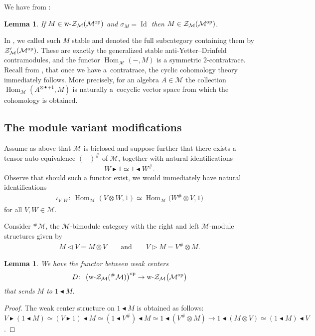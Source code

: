 \documentclass[pdftex]{sigma}
\newcommand{\Zc}{\mathcal{Z}}
\newcommand{\la}{\triangleright}
\newcommand{\ra}{\triangleleft}
\newcommand{\lab}{\blacktriangleright}
\newcommand{\rab}{\blacktriangleleft}
\def\ot{\otimes}
\numberwithin{equation}{section}
\newtheorem{Lemma}[Theorem]{Lemma}
 { \theoremstyle{definition}
\newtheorem{Definition}[Theorem]{Definition}
\newtheorem{Remark}[Theorem]{Remark} }
\begin{document}
We have from \cite{sk}:
\begin{Lemma}\label{weakstrong} If $M\in \text{\rm w-}\Zc_{\mathcal{M}}(\mathcal{M}^{\rm op})$ and $\sigma_M=\operatorname{Id}$ then $M\in \Zc_{\mathcal{M}}(\mathcal{M}^{\rm op})$.
 \end{Lemma}

 In \cite{sk}, we called such $M$ stable and denoted the full subcategory containing them by $\Zc_{\mathcal{M}}'(\mathcal{M}^{\rm op})$. These are exactly the generalized stable anti-Yetter--Drinfeld contramodules, and the functor $\operatorname{Hom}_{\mathcal{M}}(-,M)$ is a symmetric $2$-contratrace. Recall from \cite{hks}, that once we have a~contratrace, the cyclic cohomology theory immediately follows. More precisely, for an algebra $A\in\mathcal{M}$ the collection $\operatorname{Hom}_{\mathcal{M}}(A^{\ot\bullet+1},M)$ is naturally a~cocyclic vector space from which the cohomology is obtained.

 \subsection{The module variant modifications}
 Assume as above that $\mathcal{M}$ is biclosed and suppose further that there exists a tensor auto-equivalence $(-)^{\#}$ of $\mathcal{M}$, together with natural identifications
 \begin{gather*}
 W\lab 1\simeq 1\rab W^{\#}.
 \end{gather*}
 Observe that should such a functor exist, we would immediately have natural identifications
 \begin{gather*}
 \iota_{V,W}\colon \ \operatorname{Hom}_\mathcal{M}(V\ot W, 1)\simeq \operatorname{Hom}_\mathcal{M}\big(W^{\#}\ot V, 1\big)
 \end{gather*}
 for all $V,W\in\mathcal{M}$.

 Consider ${^{\#}\mathcal{M}}$, the $\mathcal{M}$-bimodule category with the right and left $\mathcal{M}$-module structures given by
 \begin{gather*}
 M \ra V= M\otimes V \qquad \text{and} \qquad V \la M= V^\# \otimes M .
 \end{gather*}

 \begin{Lemma}\label{dfun}We have the functor between weak centers
\begin{gather*}
D\colon \ \big(\text{\rm w-}\Zc_{\mathcal{M}}({^{\#}\mathcal{M}})\big)^{\rm op}\to \text{\rm w-}\Zc_{\mathcal{M}}\big(\mathcal{M}^{\rm op}\big)
\end{gather*}
that sends $M$ to $1\rab M$.
 \end{Lemma}
 \begin{proof}
The weak center structure on $1\rab M$ is obtained as follows: $V\lab(1\rab M)\simeq (V\lab 1)\rab M\simeq (1\rab V^{\#})\rab M\simeq 1\rab(V^{\#}\ot M)\to 1\rab(M\ot V)\simeq(1\rab M)\rab V$.
 \end{proof}
\end{document}
